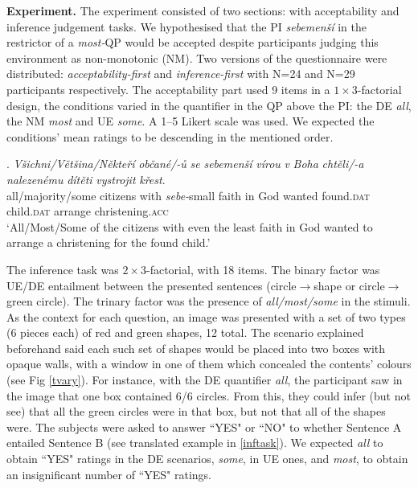 \documentclass[12pt, a4]{article}
\begin{document}
\noindent \textbf{Experiment.} \noindent The experiment consisted of two sections: with acceptability and inference judgement tasks. We hypothesised that the PI \textit{sebemenší} in the restrictor of a \textit{most-}QP would be accepted despite participants judging this environment as non-monotonic (NM). Two versions of the questionnaire were distributed: \textit{acceptability-first} and \textit{inference-first} with N=24 and N=29 participants respectively. The acceptability part used 9 items in a $1\times3$-factorial design, the conditions varied in the quantifier in the QP above the PI: the DE \textit{all}, the NM \textit{most} and UE \textit{some}. A 1--5 Likert scale was used. We expected the conditions' mean ratings to be descending in the mentioned order.\vspace{-2mm}

\exg. \textit{Všichni/Většina/Někteří} \textit{občané/-ů} \textit{se} \textit{sebemenší} \textit{vírou} \textit{v} \textit{Boha} \textit{chtěli/-a} \textit{nalezenému} \textit{dítěti} \textit{vystrojit} \textit{křest}.\label{dite}\\
all/majority/some citizens with \textit{sebe-}small faith in God wanted found.\textsc{dat} child.\textsc{dat} arrange christening.\textsc{acc}\\
\small ‘All/Most/Some of the citizens with even the least faith in God wanted to arrange a christening for the found child.’\vspace{-2mm}

\noindent The inference task was $2\times3$-factorial, with 18 items. The binary factor was UE/DE entailment between the presented sentences (circle$\rightarrow$shape or circle$\rightarrow$green circle). The trinary factor was the presence of \textit{all/most/some} in the stimuli. As the context for each question, an image was presented with a set of two types (6 pieces each) of red and green shapes, 12 total. The scenario explained beforehand said each such set of shapes would be placed into two boxes with opaque walls, with a window in one of them which concealed the contents' colours (see Fig \ref{tvary}). For instance, with the DE quantifier \textit{all}, the participant saw in the image that one box contained 6/6 circles. From this, they could infer (but not see) that all the green circles were in that box, but not that all of the shapes were. The subjects were asked to answer ``YES" or ``NO" to whether Sentence A entailed Sentence B (see translated example in \ref{inftask}). We expected \textit{all} to obtain ``YES" ratings in the DE scenarios, \textit{some}, in UE ones, and \textit{most}, to obtain an insignificant number of ``YES" ratings.\vspace{-2mm}
\end{document}
